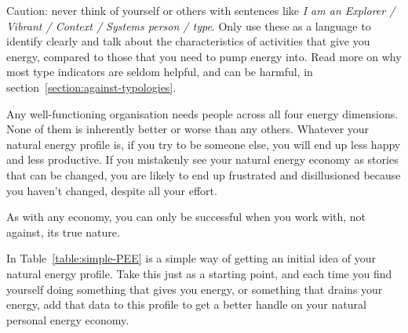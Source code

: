 Caution: never think of yourself or others with sentences like \emph{I \emph{am} an Explorer / Vibrant / Context / Systems person / type}. Only use these as a language to identify clearly and talk about the characteristics of activities that give you energy, compared to those that you need to pump energy into. Read more on why most type indicators are seldom helpful, and can be harmful, in section~\ref{section:against-typologies}. 


Any well-functioning organisation needs people across all four energy dimensions. None of them is inherently better or worse than any others. Whatever your natural energy profile is, if you try to be someone else, you will end up less happy and less productive. If you mistakenly see your natural energy economy as stories that can be changed, you are likely to end up frustrated and disillusioned because you haven't changed, despite all your effort.


As with any economy, you can only be successful when you work with, not against, its true nature.


In Table~\ref{table:simple-PEE} is a simple way of getting an initial idea of your natural energy profile. Take this just as a starting point, and each time you find yourself doing something that gives you energy, or something that drains your energy, add that data to this profile to get a better handle on your natural personal energy economy. 


